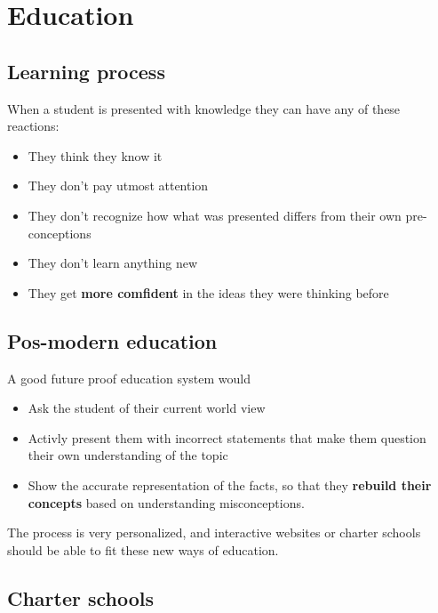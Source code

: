 
\section{Education} 

\subsection{Learning process} 
When a student is presented with knowledge they can have any of these reactions:
\begin{itemize}
	\item They think they know it
	\item They don't pay utmost attention
	\item They don't recognize how what was presented differs from their own pre-conceptions
	\item They don't learn anything new
	\item They get \textbf{more comfident} in the ideas they were thinking before
\end{itemize}

\subsection{Pos-modern education}

A good future proof education system would

\begin{itemize}
	\item Ask the student of their current world view
	\item Activly present them with incorrect statements that make them question their own understanding of the topic
	\item Show the accurate representation of the facts, so that they \textbf{rebuild their concepts} based on understanding misconceptions.
\end{itemize}

The process is very personalized, and interactive websites or charter schools should be able to fit these new ways of education. 


\subsection{Charter schools} 



